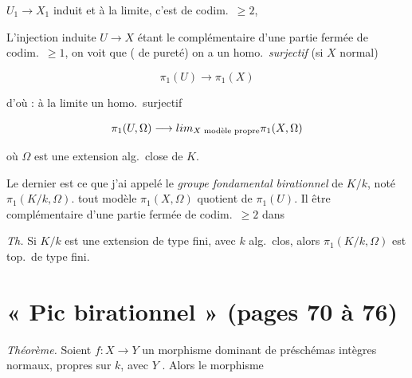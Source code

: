 \documentclass[11pt,a4paper]{article}
\begin{document}

$U_1 \to X_1$ induit \struck{\ill{}} \ill{} et à la limite, c'est \ill{} de
codim.\ $\geq 2$, 



L'injection \ill{} induite $U \to X$ étant \ill{} le complémentaire d'une
partie fermée de codim.\ $\geq 1$, on voit que (\ill{} de pureté) on a un
homo.\ \emph{surjectif} (si $X$ normal)

\[ \pi_1(U) \longrightarrow \pi_1(X) \]

d'où : à la limite un homo.\ surjectif

\[ \pi_1(U, \Omega) \longrightarrow
   \varprojlim_{X \text{ modèle propre}} \pi_1(X, \Omega) \]

où $\Omega$ est une extension alg.\ close de $K$.

Le dernier est ce que j'ai appelé le \emph{groupe fondamental birationnel} de
$K/k$, \ill{} noté $\pi_1(K/k, \Omega)$. \ill{} tout modèle \ill{}
$\pi_1(X, \Omega)$ \ill{} quotient de $\pi_1(U)$. \ill{} Il \ill{} être
\ill{} complémentaire d'une partie fermée de codim.\ $\geq 2$ dans \ill{}

\marginal{\ill{}}

\emph{Th.} Si $K/k$ est une extension de type fini, avec $k$ alg.\ clos,
alors \struck{\ill{}} $\pi_1(K/k, \Omega)$ est top.\ de type fini.

\section*{« Pic birationnel » (pages 70 à 76)}


\emph{Théorème.} Soient $f : X \to Y$ un morphisme dominant
 de préschémas intègres normaux,  propres sur
$k$, avec $Y$ \struck{\ill{}} . Alors le morphisme
\end{document}
